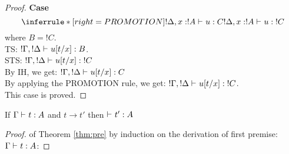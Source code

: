 \documentclass[titlepage]{article}
\begin{document}
\begin{proof}
  \noindent \textbf{Case}
  \[
   \inferrule*[ right = PROMOTION ]
   {!\Delta, x:!A \jtype{}{}{u}{C}}
   { ! \Delta, x:!A  \jtype{}{}{u}{!C}  }
  \]
  where $B = !C$.\\
  TS: $! \Gamma, ! \Delta \mathrel{\vdash_{}^{} {u[t/x]} : {B}}$.\\
  STS: $! \Gamma, ! \Delta \mathrel{\vdash_{}^{} {u[t/x]} : {!C}}$\\
  By IH, we get: $! \Gamma, ! \Delta \mathrel{\vdash_{}^{} {u[t/x]} : {C}}$\\
  By applying the PROMOTION rule, we get: $! \Gamma, ! \Delta \mathrel{\vdash_{}^{} {u[t/x]} : {!C}}$.\\
  This case is proved.
\end{proof}


\begin{theorem}[Preservation]
\label{thm:pre}
  If $\Gamma \mathrel{\vdash_{}^{} {t} : {A}}$ and $t \rightarrow t' $ then $ \mathrel{\vdash_{}^{} {t'} : {A}} $
\end{theorem}
\begin{proof} of Theorem \ref{thm:pre} by induction on the derivation  of first premise: $\Gamma \mathrel{\vdash_{}^{} {t} : {A}}$:


\end{proof}
\end{document}
